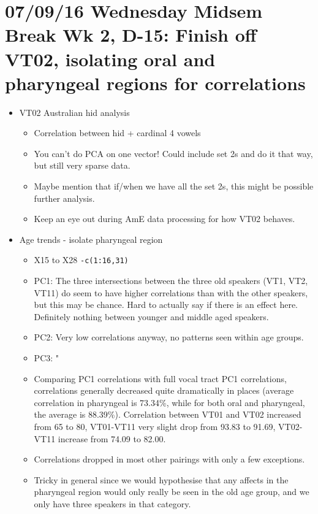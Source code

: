 \documentclass{article}
\begin{document}
\section*{07/09/16 Wednesday Midsem Break Wk 2, D-15: Finish off VT02, isolating oral and pharyngeal regions for correlations}
\begin{itemize}
    \item VT02 Australian hid analysis
    \begin{itemize}
        \item Correlation between hid + cardinal 4 vowels
        \item You can't do PCA on one vector! Could include set 2s and do it that way, but still very sparse data.
        \item Maybe mention that if/when we have all the set 2s, this might be possible further analysis.
        \item Keep an eye out during AmE data processing for how VT02 behaves.
    \end{itemize}
    \item Age trends - isolate pharyngeal region
    \begin{itemize}
        \item X15 to X28 \verb|-c(1:16,31)|
        \item PC1: The three intersections between the three old speakers (VT1, VT2, VT11) do seem to have higher correlations than with the other speakers, but this may be chance. Hard to actually say if there is an effect here. Definitely nothing between younger and middle aged speakers.
        \item PC2: Very low correlations anyway, no patterns seen within age groups.
        \item PC3: "
        \item Comparing PC1 correlations with full vocal tract PC1 correlations, correlations generally decreased quite dramatically in places (average correlation in pharyngeal is 73.34\%, while for both oral and pharyngeal, the average is 88.39\%). Correlation between VT01 and VT02 increased from 65 to 80, VT01-VT11 very slight drop from 93.83 to 91.69, VT02-VT11 increase from 74.09 to 82.00.
        \item Correlations dropped in most other pairings with only a few exceptions.
        \item Tricky in general since we would hypothesise that any affects in the pharyngeal region would only really be seen in the old age group, and we only have three speakers in that category.

\end{itemize}
\end{itemize}
\end{document}
